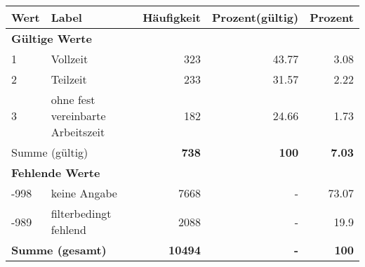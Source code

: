      \begin{longtable}{lXrrr}
     \toprule
     \textbf{Wert} & \textbf{Label} & \textbf{Häufigkeit} & \textbf{Prozent(gültig)} & \textbf{Prozent} \\
     \endhead
     \midrule
     \multicolumn{5}{l}{\textbf{Gültige Werte}}\\

     1 &
     \multicolumn{1}{X}{ Vollzeit   } &


       \num{323} &
       \num[round-mode=places,round-precision=2]{43,77} &
         \num[round-mode=places,round-precision=2]{3,08} \\

     2 &
     \multicolumn{1}{X}{ Teilzeit   } &


       \num{233} &
       \num[round-mode=places,round-precision=2]{31,57} &
         \num[round-mode=places,round-precision=2]{2,22} \\

     3 &
     \multicolumn{1}{X}{ ohne fest vereinbarte Arbeitszeit   } &


       \num{182} &
       \num[round-mode=places,round-precision=2]{24,66} &
         \num[round-mode=places,round-precision=2]{1,73} \\
     \midrule
     \multicolumn{2}{l}{Summe (gültig)} &
       \textbf{\num{738}} &
     \textbf{100} &
       \textbf{\num[round-mode=places,round-precision=2]{7,03}} \\
     \multicolumn{5}{l}{\textbf{Fehlende Werte}}\\
       -998 &
       keine Angabe &
         \num{7668} &
        - &
         \num[round-mode=places,round-precision=2]{73,07} \\
       -989 &
       filterbedingt fehlend &
         \num{2088} &
        - &
         \num[round-mode=places,round-precision=2]{19,9} \\
     \midrule
     \multicolumn{2}{l}{\textbf{Summe (gesamt)}} &
          \textbf{\num{10494}} &
        \textbf{-} &
        \textbf{100} \\
     \bottomrule
     \end{longtable}
     
